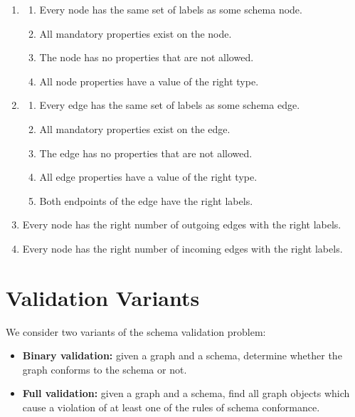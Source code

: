 \documentclass{report}
\theoremstyle{definition}
\begin{document}
\begin{enumerate}
  \item
        \begin{enumerate}
          \item\label{rule:simp-node-labels}
          Every node has the same set of labels as some schema node.
          \item\label{rule:simp-node-mandatory-props}
          All mandatory properties exist on the node.
          \item\label{rule:simp-node-allowed-props}
          The node has no properties that are not allowed.
          \item\label{rule:simp-node-datatype}
          All node properties have a value of the right type.
        \end{enumerate}
  \item
        \begin{enumerate}
          \item\label{rule:simp-edge-labels}
          Every edge has the same set of labels as some schema edge.
          \item\label{rule:simp-edge-mandatory-props}
          All mandatory properties exist on the edge.
          \item\label{rule:simp-edge-allowed-props}
          The edge has no properties that are not allowed.
          \item\label{rule:simp-edge-datatype}
          All edge properties have a value of the right type.
          \item\label{rule:simp-edge-endpoints}
          Both endpoints of the edge have the right labels.
        \end{enumerate}
        \item\label{rule:simp-card-out}
        Every node has the right number of outgoing edges with the right labels.
        \item\label{rule:simp-card-in}
        Every node has the right number of incoming edges with the right labels.
\end{enumerate}

\section{Validation Variants}
\label{sec:variants}

We consider two variants of the schema validation problem:

\begin{itemize}
  \item \textbf{Binary validation:} given a graph and a schema, determine whether the graph conforms to the schema or not.
  \item \textbf{Full validation:} given a graph and a schema, find all graph objects which cause a violation of at least one of the rules of schema conformance.
\end{itemize}
\end{document}
